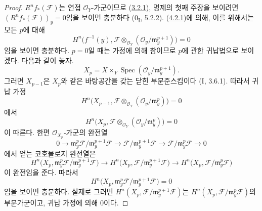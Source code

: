 \begin{proof}
$R^nf_*(\mathcal F)$는 연접 $\mathcal O_Y$-가군이므로
(\hyperref[III.3.2.1-fr]{3.2.1}), 명제의 첫째 주장을 보이려면
$(R^nf_*(\mathcal F))_y=0$임을 보이면 충분하다
(0\textsubscript{I}, 5.2.2). (\hyperref[III.4.2.1-fr]{4.2.1})에
의해, 이를 위해서는 모든 $p$에 대해
\[
H^n\bigl(f^{-1}(y),\mathcal F\otimes_{\mathcal O_Y}
(\mathcal O_y/\mathfrak m_y^{p+1})\bigr)=0
\]
임을 보이면 충분하다. $p=0$일 때는 가정에 의해 참이므로 $p$에
관한 귀납법으로 보이겠다. 다음과 같이 놓자.
\[
X_p=X\times_Y\operatorname{Spec}
(\mathcal O_y/\mathfrak m_y^{p+1}).
\]
그러면 $X_{p-1}$은 $X_p$와 같은 바탕공간을 갖는 닫힌 부분준스킴이다
(I, 3.6.1). 따라서 귀납 가정
\[
H^n\bigl(X_{p-1},\mathcal F\otimes_{\mathcal O_Y}
(\mathcal O_y/\mathfrak m_y^p)\bigr)=0
\]
에서
\[
H^n\bigl(X_p,\mathcal F\otimes_{\mathcal O_Y}
(\mathcal O_y/\mathfrak m_y^p)\bigr)=0
\]
이 따른다. 한편 $\mathcal O_{X_p}$-가군의 완전열
\[
0\longrightarrow
\mathfrak m_y^p\mathcal F/\mathfrak m_y^{p+1}\mathcal F
\longrightarrow
\mathcal F/\mathfrak m_y^{p+1}\mathcal F
\longrightarrow
\mathcal F/\mathfrak m_y^p\mathcal F
\longrightarrow0
\]
에서 얻는 코호몰로지 완전열은
\[
H^n\bigl(X_p,
\mathfrak m_y^p\mathcal F/\mathfrak m_y^{p+1}\mathcal F\bigr)
\longrightarrow
H^n\bigl(X_p,\mathcal F/\mathfrak m_y^{p+1}\mathcal F\bigr)
\longrightarrow
H^n\bigl(X_p,\mathcal F/\mathfrak m_y^p\mathcal F\bigr)
\]
이 완전임을 준다. 따라서
\[
\label{III.4.6.1.1-fr}
H^n\bigl(X_p,
\mathfrak m_y^p\mathcal F/\mathfrak m_y^{p+1}\mathcal F\bigr)=0
\tag{4.6.1.1}
\]
임을 보이면 충분하다. 실제로 그러면
$H^n(X_p,\mathcal F/\mathfrak m_y^{p+1}\mathcal F)$는
$H^n(X_p,\mathcal F/\mathfrak m_y^p\mathcal F)$의 부분가군이고,
귀납 가정에 의해 $0$이다.



\end{proof}
